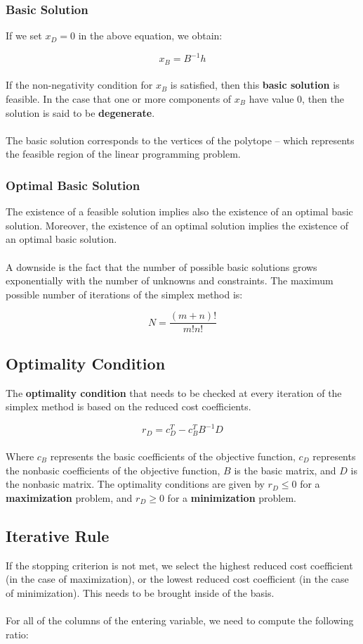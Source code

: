 \documentclass{article}
\begin{document}
\subsubsection{Basic Solution}
If we set $x_D = 0$ in the above equation, we obtain:

\[ x_B = B^{-1}h \] \\
If the non-negativity condition for $x_B$ is satisfied, then this \textbf{basic solution} is feasible. In the case that one or more components of $x_B$ have value 0, then the solution is said to be \textbf{degenerate}. \\ \\
The basic solution corresponds to the vertices of the polytope -- which represents the feasible region of the linear programming problem.

\subsubsection{Optimal Basic Solution}
The existence of a feasible solution implies also the existence of an optimal basic solution. Moreover, the existence of an optimal solution implies the existence of an optimal basic solution. \\ \\
A downside is the fact that the number of possible basic solutions grows exponentially with the number of unknowns and constraints. The maximum possible number of iterations of the simplex method is:

\[ N = \frac{(m + n)!}{m!n!} \]

\subsection{Optimality Condition}
The \textbf{optimality condition} that needs to be checked at every iteration of the simplex method is based on the reduced cost coefficients.

\[ r_D = c^T_D - c^T_B B^{-1}D \] \\
Where $c_B$ represents the basic coefficients of the objective function, $c_D$ represents the nonbasic coefficients of the objective function, $B$ is the basic matrix, and $D$ is the nonbasic matrix. The optimality conditions are given by $r_D \leq 0$ for a \textbf{maximization} problem, and $r_D \geq 0$ for a \textbf{minimization} problem.

\subsection{Iterative Rule}
If the stopping criterion is not met, we select the highest reduced cost coefficient (in the case of maximization), or the lowest reduced cost coefficient (in the case of minimization). This needs to be brought inside of the basis. \\ \\
For all of the columns of the entering variable, we need to compute the following ratio:
\end{document}
